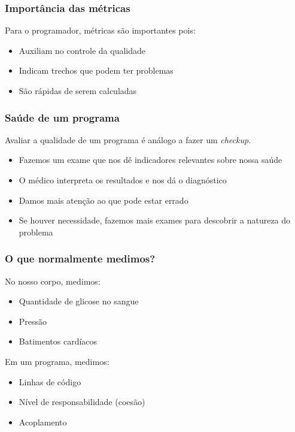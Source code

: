 \documentclass{beamer}
\begin{document}
\begin{frame}
  \frametitle{Importância das métricas}

  Para o programador, métricas são importantes pois:
  \begin{itemize}
    \item Auxiliam no controle da qualidade
    \item Indicam trechos que podem ter problemas
    \item São rápidas de serem calculadas
  \end{itemize}
\end{frame}

\begin{frame}
  \frametitle{Saúde de um programa}

  Avaliar a qualidade de um programa é análogo a fazer um \textit{checkup}.
  \begin{itemize}
    \item Fazemos um exame que nos dê indicadores relevantes sobre nossa saúde
    \item O médico interpreta os resultados e nos dá o diagnóstico
    \item Damos mais atenção ao que pode estar errado
    \item Se houver necessidade, fazemos mais exames para descobrir a natureza do problema
  \end{itemize}
\end{frame}

\begin{frame}
  \frametitle{O que normalmente medimos?}

  No nosso corpo, medimos:
  \begin{itemize}
    \item Quantidade de glicose no sangue
    \item Pressão
    \item Batimentos cardíacos
  \end{itemize}

  Em um programa, medimos:
  \begin{itemize}
    \item Linhas de código
    \item Nível de responsabilidade (coesão)
    \item Acoplamento
  \end{itemize}
\end{frame}
\end{document}
